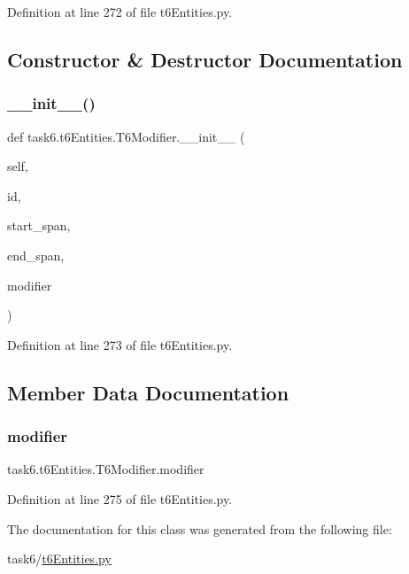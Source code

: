 Definition at line 272 of file t6\+Entities.\+py.



\subsection{Constructor \& Destructor Documentation}
\mbox{\label{classtask6_1_1t6Entities_1_1T6Modifier_a472b7516cd488b8a12e8fff5ca48d1f5}} 
\subsubsection{\texorpdfstring{\+\_\+\+\_\+init\+\_\+\+\_\+()}{\_\_init\_\_()}}
{\footnotesize\ttfamily def task6.\+t6\+Entities.\+T6\+Modifier.\+\_\+\+\_\+init\+\_\+\+\_\+ (\begin{DoxyParamCaption}\item[{}]{self,  }\item[{}]{id,  }\item[{}]{start\+\_\+span,  }\item[{}]{end\+\_\+span,  }\item[{}]{modifier }\end{DoxyParamCaption})}



Definition at line 273 of file t6\+Entities.\+py.



\subsection{Member Data Documentation}
\mbox{\label{classtask6_1_1t6Entities_1_1T6Modifier_adca8df4abb0ccb35146606b8610f27a1}} 
\subsubsection{\texorpdfstring{modifier}{modifier}}
{\footnotesize\ttfamily task6.\+t6\+Entities.\+T6\+Modifier.\+modifier}



Definition at line 275 of file t6\+Entities.\+py.



The documentation for this class was generated from the following file\+:\begin{DoxyCompactItemize}
\item 
task6/\hyperlink{t6Entities_8py}{t6\+Entities.\+py}\end{DoxyCompactItemize}
